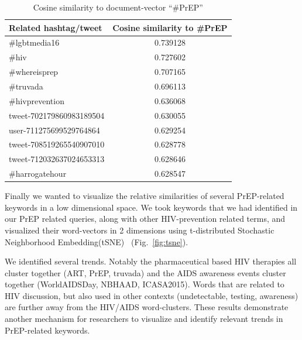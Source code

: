 \documentclass[conference]{IEEEtran}
\begin{document}
\begin{table}
\centering
\caption{Cosine similarity to document-vector ``\#PrEP''}
\begin{tabular}{|l|c|} \hline
Related hashtag/tweet & Cosine similarity to \#PrEP\\ \hline
\#lgbtmedia16 & 0.739128\\ \hline
\#hiv & 	0.727602 \\ \hline
\#whereisprep & 0.707165 \\ \hline
\#truvada & 0.696113 \\ \hline
\#hivprevention & 0.636068 \\ \hline
tweet-702179860983189504 & 0.630055\\ \hline
user-711275699529764864 & 0.629254\\ \hline
tweet-708519265540907010 & 0.628778 \\ \hline
tweet-712032637024653313 & 0.628646 \\ \hline
\#harrogatehour & 0.628547 \\ \hline
\hline\end{tabular}
\label{tbl:d2v}
\end{table}

Finally we wanted to visualize the relative similarities of several PrEP-related keywords in a low dimensional space. We took keywords that we had identified in our PrEP related queries, along with other HIV-prevention related terms, and visualized their word-vectors in 2 dimensions using t-distributed Stochastic Neighborhood Embedding(tSNE)~\cite{van2008visualizing} (Fig.~\ref{fig:tsne}).

We identified several trends. Notably the pharmaceutical based HIV therapies all cluster together (ART, PrEP, truvada) and the AIDS awareness events cluster together (WorldAIDSDay, NBHAAD, ICASA2015). Words that are related to HIV discussion, but also used in other contexts (undetectable, testing, awareness) are further away from the HIV/AIDS word-clusters. These results demonstrate another mechanism for researchers to visualize and identify relevant trends in PrEP-related keywords.
\end{document}
